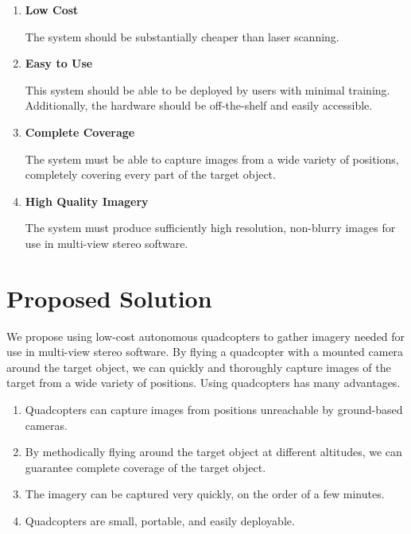 \begin{enumerate}
\item
\textbf{Low Cost}

The system should be substantially cheaper than laser scanning.

\item
\textbf{Easy to Use}

This system should be able to be deployed by users with minimal training. Additionally, the hardware should be off-the-shelf and easily accessible.

\item
\textbf{Complete Coverage}

The system must be able to capture images from a wide variety of positions, completely covering every part of the target object.

\item
\textbf{High Quality Imagery}

The system must produce sufficiently high resolution, non-blurry images for use in multi-view stereo software.

\end{enumerate}

\section{Proposed Solution}

We propose using low-cost autonomous quadcopters to gather imagery needed for use in multi-view stereo software. By flying a quadcopter with a mounted camera around the target object, we can quickly and thoroughly capture images of the target from a wide variety of positions. Using quadcopters has many advantages.

\begin{enumerate}
\item
Quadcopters can capture images from positions unreachable by ground-based cameras.

\item
By methodically flying around the target object at different altitudes, we can guarantee complete coverage of the target object.

\item
The imagery can be captured very quickly, on the order of a few minutes.

\item
Quadcopters are small, portable, and easily deployable.


\end{enumerate}

